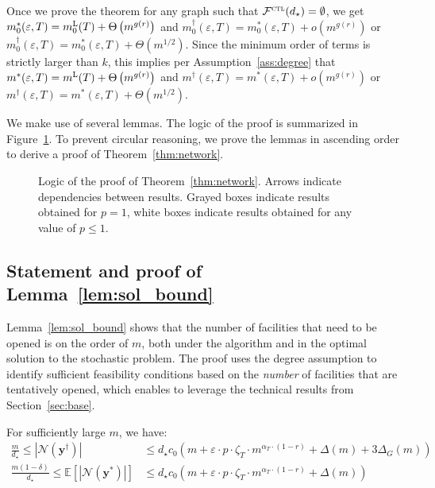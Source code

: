 \documentclass[nonblindrev]{informs3noheader}
\def\E{\mathbb{E}}
\def\calF{\mathcal{F}}
\def\calN{\mathcal{N}}
\def\by{\boldsymbol{y}}
\begin{document}
Once we prove the theorem for any graph such that $\calF^\textsc{ctl}(d_\star)=\emptyset$, we get $m_0^*(\varepsilon, T)=m_0^{\textsc{L}}(T)+\Theta\left(m^{g(r)}\right)$ and $m_0^\dagger(\varepsilon, T)=m_0^*(\varepsilon, T)+o\left(m^{g(r)}\right)$ or $m_0^\dagger(\varepsilon, T)=m_0^*(\varepsilon, T)+\Theta\left(m^{1/2}\right)$. Since the minimum order of terms is strictly larger than $k$, this implies per Assumption~\ref{ass:degree} that $m^*(\varepsilon, T)=m^{\textsc{L}}(T)+\Theta\left(m^{g(r)}\right)$ and $m^\dagger(\varepsilon, T)=m^*(\varepsilon, T)+o\left(m^{g(r)}\right)$ or $m^\dagger(\varepsilon, T)=m^*(\varepsilon, T)+\Theta\left(m^{1/2}\right)$.

We make use of several lemmas. The logic of the proof is summarized in Figure~\ref{fig:proof_network}. To prevent circular reasoning, we prove the lemmas in ascending order to derive a proof of Theorem~\ref{thm:network}.

\begin{figure}[h!]
\begin{figure}[omitted: a diagram of this paper's results, not reproduced here]\end{figure}
\caption{Logic of the proof of Theorem~\ref{thm:network}. Arrows indicate dependencies between results. Grayed boxes indicate results obtained for $p=1$, white boxes indicate results obtained for any value of $p\leq1$.}
\label{fig:proof_network}
\end{figure}
\vspace{12pt}

\subsection{Statement and proof of Lemma~\ref{lem:sol_bound}}

Lemma~\ref{lem:sol_bound} shows that the number of facilities that need to be opened is on the order of $m$, both under the algorithm and in the optimal solution to the stochastic problem. The proof uses the degree assumption to identify sufficient feasibility conditions based on the \textit{number} of facilities that are tentatively opened, which enables to leverage the technical results from Section~\ref{sec:base}.

\begin{lemma}\label{lem:sol_bound}
    For sufficiently large $m$, we have:
    \begin{align*}
        \frac{m}{d_\star} \leq |\calN(\by^\dagger)|&\leq  d_\star c_0\left(m + \varepsilon\cdot p \cdot \zeta_T\cdot m^{\alpha_T\cdot(1-r)} +\Delta(m)+3\Delta_G(m)\right)\\
        \frac{m(1-\delta)}{d_\star} \leq \E[|\calN(\by^*)|]&\leq   d_\star c_0\left(m + \varepsilon\cdot p \cdot \zeta_T\cdot m^{\alpha_T\cdot(1-r)} + \Delta(m)\right)      
    \end{align*}
\end{lemma}
\end{document}

